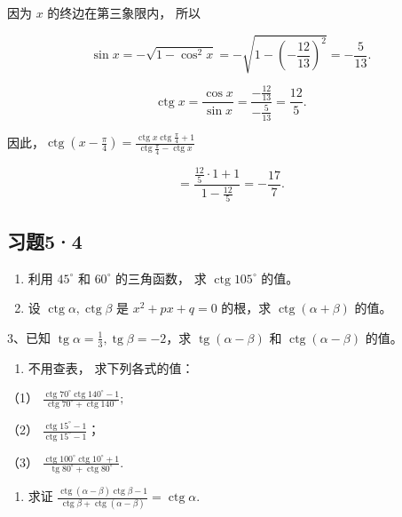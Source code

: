  因为 \(x\) 的终边在第三象限内， 所以

\[
\sin x = - \sqrt {1 - \cos^ {2} x} = - \sqrt {1 - \left(- \frac {12}{13}\right) ^ {2}} = - \frac {5}{13}.
\]

\[
\operatorname{ctg} x = \frac {\cos x}{\sin x} = \frac {- \frac {12}{13}}{- \frac {5}{13}} = \frac {12}{5}.
\]

因此，\(\operatorname{ctg}\left(x - \frac{\pi}{4}\right) = \frac{\operatorname{ctg} x \operatorname{ctg} \frac{\pi}{4} + 1}{\operatorname{ctg} \frac{\pi}{4} - \operatorname{ctg} x}\)

\[
= \frac {\frac {12}{5} \cdot 1 + 1}{1 - \frac {12}{5}} = - \frac {17}{7}.
\]

\subsection{习题5·4}

\begin{enumerate}
\item
  利用 \(45^{\circ}\) 和 \(60^{\circ}\) 的三角函数， 求
  \(\operatorname{ctg} 105^{\circ}\) 的值。
\item
  设 \(\operatorname{ctg} \alpha, \operatorname{ctg} \beta\) 是
  \(x^{2} + px + q = 0\) 的根，求 \(\operatorname{ctg}(\alpha + \beta)\)
  的值。
\end{enumerate}

3、已知
\(\operatorname{tg} \alpha = \frac{1}{3}, \operatorname{tg} \beta = -2\)，求
\(\operatorname{tg}(\alpha - \beta)\) 和
\(\operatorname{ctg}(\alpha - \beta)\) 的值。

\begin{enumerate}[start=4]
\item
  不用查表， 求下列各式的值：
\end{enumerate}

（1）
\(\frac{\operatorname{ctg} 70^{\circ} \operatorname{ctg} 140^{\circ} - 1}{\operatorname{ctg} 70^{\circ} + \operatorname{ctg} 140^{\circ}};\)

（2）
\(\frac{\operatorname{ctg} 15^{\circ} - 1}{\operatorname{ctg} 15^{\circ} - 1}\)；

（3）
\(\frac{\operatorname{ctg} 100^{\circ} \operatorname{ctg} 10^{\circ} + 1}{\operatorname{tg} 80^{\circ} + \operatorname{ctg} 80^{\circ}}.\)

\begin{enumerate}[start=5]
\item
  求证
  \(\frac{\operatorname{ctg}(\alpha - \beta)\operatorname{ctg}\beta - 1}{\operatorname{ctg}\beta + \operatorname{ctg}(\alpha - \beta)} = \operatorname{ctg}\alpha.\)
\end{enumerate}

